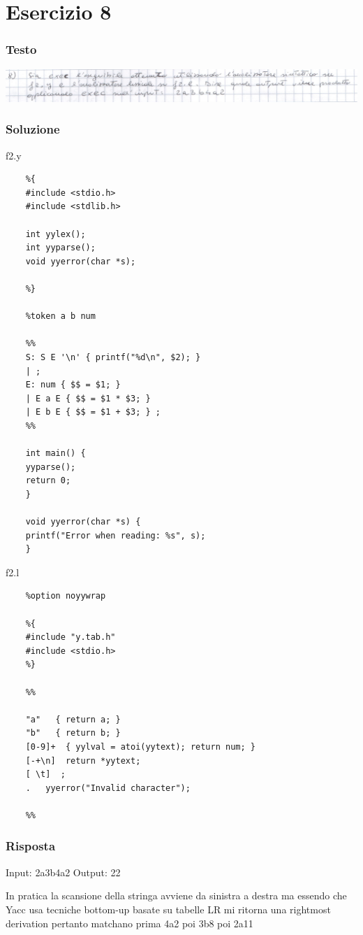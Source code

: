 \chapter{Esercizio 8}

\subsection{Testo}

\begin{center}
    \includegraphics[scale=0.2]{Chapters/Img/08text.png}\\
\end{center} 

\subsection{Soluzione}
f2.y
\begin{lstlisting}
    %{
    #include <stdio.h>
    #include <stdlib.h>
    
    int yylex();
    int yyparse();
    void yyerror(char *s);

    %}

    %token a b num

    %%
    S: S E '\n' { printf("%d\n", $2); }
    | ;
    E: num { $$ = $1; }
    | E a E { $$ = $1 * $3; }
    | E b E { $$ = $1 + $3; } ;
    %%

    int main() {
    yyparse();
    return 0;
    }

    void yyerror(char *s) {
    printf("Error when reading: %s", s);
    }
\end{lstlisting}

f2.l
\begin{lstlisting}
    %option noyywrap

    %{
    #include "y.tab.h"
    #include <stdio.h>
    %}

    %%

    "a"   { return a; }
    "b"   { return b; }
    [0-9]+  { yylval = atoi(yytext); return num; }
    [-+\n]  return *yytext;
    [ \t]  ;
    .   yyerror("Invalid character");

    %%
\end{lstlisting}

\subsection{Risposta}
Input: 2a3b4a2
Output: 22

In pratica la scansione della stringa avviene da sinistra a 
destra ma essendo che Yacc usa tecniche bottom-up basate su 
tabelle LR mi ritorna una rightmost derivation pertanto matchano 
prima 4a2 poi 3b8 poi 2a11